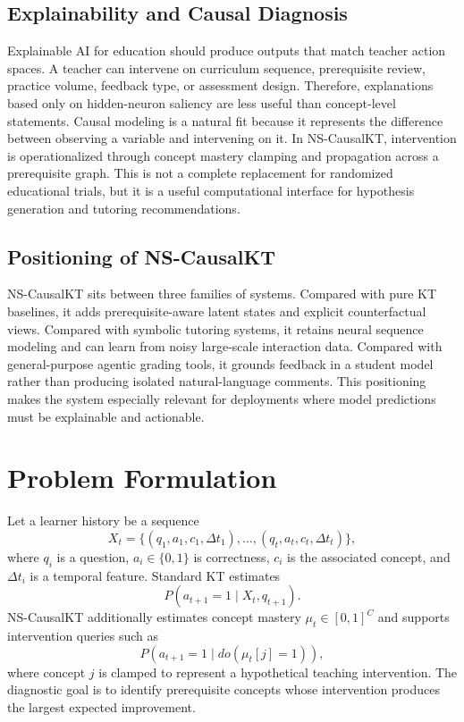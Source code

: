 \documentclass[conference]{IEEEtran}
\begin{document}
\subsection{Explainability and Causal Diagnosis}
Explainable AI for education should produce outputs that match teacher action spaces. A teacher can intervene on curriculum sequence, prerequisite review, practice volume, feedback type, or assessment design. Therefore, explanations based only on hidden-neuron saliency are less useful than concept-level statements. Causal modeling is a natural fit because it represents the difference between observing a variable and intervening on it. In NS-CausalKT, intervention is operationalized through concept mastery clamping and propagation across a prerequisite graph. This is not a complete replacement for randomized educational trials, but it is a useful computational interface for hypothesis generation and tutoring recommendations.

\subsection{Positioning of NS-CausalKT}
NS-CausalKT sits between three families of systems. Compared with pure KT baselines, it adds prerequisite-aware latent states and explicit counterfactual views. Compared with symbolic tutoring systems, it retains neural sequence modeling and can learn from noisy large-scale interaction data. Compared with general-purpose agentic grading tools, it grounds feedback in a student model rather than producing isolated natural-language comments. This positioning makes the system especially relevant for deployments where model predictions must be explainable and actionable.

\section{Problem Formulation}
Let a learner history be a sequence
\begin{equation}
X_t = \{(q_1,a_1,c_1,\Delta t_1),\ldots,(q_t,a_t,c_t,\Delta t_t)\},
\end{equation}
where $q_i$ is a question, $a_i\in\{0,1\}$ is correctness, $c_i$ is the associated concept, and $\Delta t_i$ is a temporal feature. Standard KT estimates
\begin{equation}
P(a_{t+1}=1 \mid X_t, q_{t+1}).
\end{equation}
NS-CausalKT additionally estimates concept mastery $\mu_t\in[0,1]^C$ and supports intervention queries such as
\begin{equation}
P(a_{t+1}=1 \mid do(\mu_t[j]=1)),
\end{equation}
where concept $j$ is clamped to represent a hypothetical teaching intervention. The diagnostic goal is to identify prerequisite concepts whose intervention produces the largest expected improvement.
\end{document}
